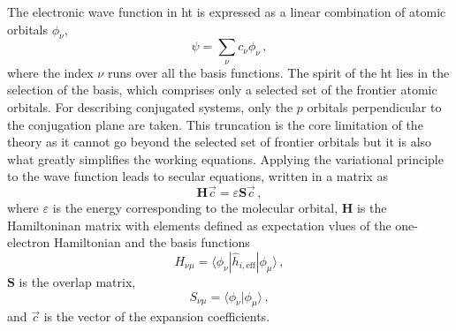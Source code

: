 The electronic wave function in \acrshort{ht} is expressed as a linear combination of atomic orbitals $\phi_\nu$,
\begin{equation}
\psi= \sum_\nu c_\nu \phi_\nu \, ,
\label{eq:huckel3}
\end{equation}
where the index $\nu$ runs over all the basis functions. The spirit of the \acrshort{ht} lies in the selection of the basis, which comprises only a selected set of the frontier atomic orbitals. For describing conjugated systems, only the $p$ orbitals perpendicular to the conjugation plane are taken. This truncation is the core limitation of the theory as it cannot go beyond the selected set of frontier orbitals but it is also what greatly simplifies the working equations. Applying the variational principle to the wave function leads to secular equations, written in a matrix as
\begin{equation}
\mathbf{H}\Vec{c}=\varepsilon \mathbf{S}\Vec{c} \, ,
\label{eq:huckel4}
\end{equation}
where $\varepsilon$ is the energy corresponding to the molecular orbital, $\mathbf{H}$ is the Hamiltoninan matrix with elements defined as expectation vlues of the one-electron Hamiltonian and the basis functions
\begin{equation}
H_{\nu\mu} = \langle \phi_\nu | \hat{h}_{i, \mathrm{eff}} | \phi_\mu \rangle \, ,
\label{eq:huckel5}
\end{equation}
$\mathbf{S}$ is the overlap matrix,
\begin{equation}
S_{\nu\mu} = \langle \phi_\nu | \phi_\mu \rangle \, ,
\label{eq:huckel6}
\end{equation}
and $\Vec{c}$ is the vector of the expansion coefficients.

